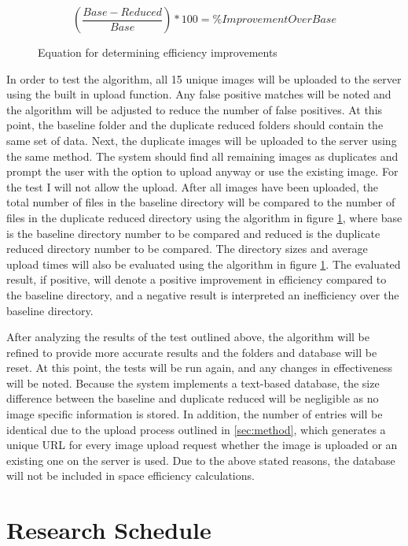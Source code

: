 \documentclass[11pt]{article}
\begin{document}
\begin{figure}[htbp]
\centering
\[\left ( \frac{Base - Reduced}{Base} \right ) * 100 = \% Improvement Over Base\]
\caption{Equation for determining efficiency improvements}
\label{benchmark_eq}
\end{figure}

In order to test the algorithm, all 15 unique images will be uploaded to the server using the built in upload function. Any false positive matches will be noted and the algorithm will be adjusted to reduce the number of false positives. At this point, the baseline folder and the duplicate reduced folders should contain the same set of data. Next, the duplicate images will be uploaded to the server using the same method. The system should find all remaining images as duplicates and prompt the user with the option to upload anyway or use the existing image. For the test I will not allow the upload. After all images have been uploaded, the total number of files in the baseline directory will be compared to the number of files in the duplicate reduced directory using the algorithm in figure \ref{benchmark_eq}, where base is the baseline directory number to be compared and reduced is the duplicate reduced directory number to be compared.  The directory sizes and average upload times will also be evaluated using the algorithm in figure \ref{benchmark_eq}. The evaluated result, if positive, will denote a positive improvement in efficiency compared to the baseline directory, and a negative result is interpreted an inefficiency over the baseline directory.

After analyzing the results of the test outlined above, the algorithm will be refined to provide more accurate results and the folders and database will be reset. At this point, the tests will be run again, and any changes in effectiveness will be noted. Because the system implements a text-based database, the size difference between the baseline and duplicate reduced will be negligible as no image specific information is stored. In addition, the number of entries will be identical due to the upload process outlined in \ref{sec:method}, which generates a unique URL for every image upload request whether the image is uploaded or an existing one on the server is used. Due to the above stated reasons, the database will not be included in space efficiency calculations.

\vspace*{-.1in}
\section{Research Schedule}
\label{sec:schedule}
\vspace*{-.1in}
\end{document}
